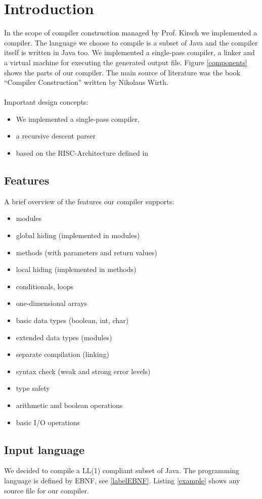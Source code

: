 \section{Introduction}
In the scope of compiler construction managed by Prof. Kirsch we implemented a compiler. The language we choose to compile is a subset of Java and the compiler itself is written in Java too. We implemented a single-pass compiler, a linker and a virtual machine for executing the generated output file. Figure \ref{components} shows the parts of our compiler. The main source of literature was the book ``Compiler Construction'' written by Nikolaus Wirth.
\paragraph{} Important design concepts:
\begin{itemize}
 \item We implemented a single-pass compiler, 
 \item a recursive descent parser 
 \item based on the RISC-Architecture defined in %
\end{itemize}
\subsection{Features}A brief overview of the features our compiler supports:
\begin{itemize}
\item modules
\item global hiding (implemented in modules)
\item methods (with parameters and return values)
\item local hiding (implemented in methods)
\item conditionals, loops
\item one-dimensional arrays
\item basic data types (boolean, int, char)
\item extended data types (modules)
\item separate compilation (linking)
\item syntax check (weak and strong error levels)
\item type safety
\item arithmetic and boolean operations
\item basic I/O operations
\end{itemize}


\subsection{Input language}
We decided to compile a LL(1) compliant subset of Java. The programming language is defined by EBNF, see \ref{labelEBNF}.
Listing \ref{example} shows any source file for our compiler.

